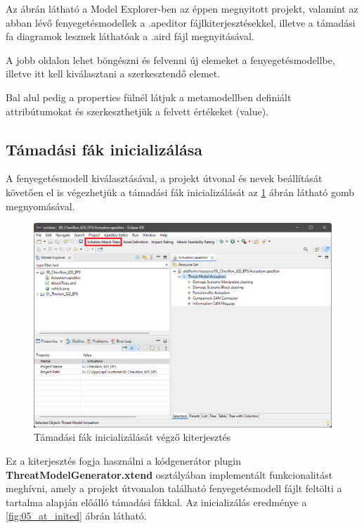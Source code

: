 Az ábrán látható a Model Explorer-ben az éppen megnyitott projekt, valamint az abban lévő fenyegetésmodellek a .apeditor fájlkiterjesztésekkel, illetve a támadási fa diagramok lesznek láthatóak a .aird fájl megnyitásával.

A jobb oldalon lehet böngészni és felvenni új elemeket a fenyegetésmodellbe, illetve itt kell kiválasztani a szerkesztendő elemet.

Bal alul pedig a properties fülnél látjuk a metamodellben definiált attribútumokat és szerkeszthetjük a felvett értékeket (value).

\subsection{Támadási fák inicializálása}

A fenyegetésmodell kiválasztásával, a projekt útvonal és nevek beállítását követően el is végezhetjük a támadási fák inicializálását az \ref{fig:05_at_init} ábrán látható gomb megnyomásával.

\begin{figure}[!ht]
	\centering
	\includegraphics[width=130mm, keepaspectratio]{figures/05_tmeditor.png}
	\caption{Támadási fák inicializálását végző kiterjesztés}
	\label{fig:05_at_init}
\end{figure}

Ez a kiterjesztés fogja használni a kódgenerátor plugin \textbf{ThreatModelGenerator.xtend} osztályában implementált funkcionalitást meghívni, amely a projekt útvonalon található fenyegetésmodell fájlt feltölti a tartalma alapján előálló támadási fákkal. Az inicializálás eredménye a \ref{fig:05_at_inited} ábrán látható.

